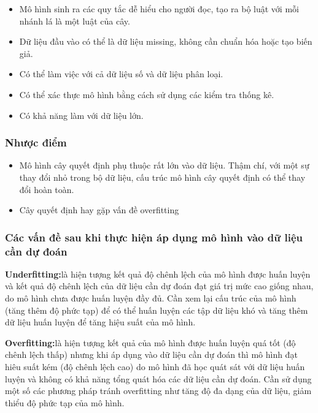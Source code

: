 \documentclass[
]{article}
\providecommand{\tightlist}{%
  \setlength{\itemsep}{0pt}\setlength{\parskip}{0pt}}
\begin{document}
\begin{itemize}
\tightlist
\item
  Mô hình sinh ra các quy tắc dễ hiểu cho người đọc, tạo ra bộ luật với
  mỗi nhánh lá là một luật của cây.
\item
  Dữ liệu đầu vào có thể là dữ liệu missing, không cần chuẩn hóa hoặc
  tạo biến giả.
\item
  Có thể làm việc với cả dữ liệu số và dữ liệu phân loại.
\item
  Có thể xác thực mô hình bằng cách sử dụng các kiểm tra thống kê.
\item
  Có khả năng làm với dữ liệu lớn.
\end{itemize}

\subsubsection{Nhược điểm}\label{nhux1b0ux1ee3c-ux111iux1ec3m-2}

\begin{itemize}
\tightlist
\item
  Mô hình cây quyết định phụ thuộc rất lớn vào dữ liệu. Thậm chí, với
  một sự thay đổi nhỏ trong bộ dữ liệu, cấu trúc mô hình cây quyết định
  có thể thay đổi hoàn toàn.
\item
  Cây quyết định hay gặp vấn đề overfitting
\end{itemize}

\subsubsection{Các vấn đề sau khi thực hiện áp dụng mô hình vào dữ liệu
cần dự
đoán}\label{cuxe1c-vux1ea5n-ux111ux1ec1-sau-khi-thux1ef1c-hiux1ec7n-uxe1p-dux1ee5ng-muxf4-huxecnh-vuxe0o-dux1eef-liux1ec7u-cux1ea7n-dux1ef1-ux111ouxe1n}

\textbf{Underfitting:}là hiện tượng kết quả độ chênh lệch của mô hình
được huấn luyện và kết quả độ chênh lệch của dữ liệu cần dự đoán đạt giá
trị mức cao giống nhau, do mô hình chưa được huấn luyện đầy đủ. Cần xem
lại cấu trúc của mô hình (tăng thêm độ phức tạp) để có thể huấn luyện
các tập dữ liệu khó và tăng thêm dữ liệu huấn luyện để tăng hiệu suất
của mô hình.

\textbf{Overfitting:}là hiện tượng kết quả của mô hình được huấn luyện
quá tốt (độ chênh lệch thấp) nhưng khi áp dụng vào dữ liệu cần dự đoán
thì mô hình đạt hiêu suất kém (độ chênh lệch cao) do mô hình đã học quát
sát với dữ liệu huấn luyện và không có khả năng tổng quát hóa các dữ
liệu cần dự đoán. Cần sử dụng một số các phương pháp tránh overfitting
như tăng độ đa dạng của dữ liệu, giảm thiểu độ phức tạp của mô hình.
\end{document}
